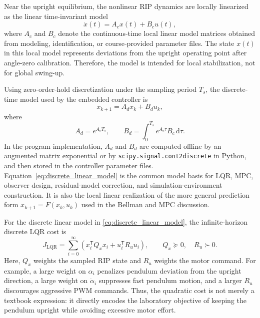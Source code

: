 \documentclass[11pt]{article}
\begin{document}
Near the upright equilibrium, the nonlinear RIP dynamics are locally linearized as the linear time-invariant model
\begin{equation}
\dot{x}(t)=A_cx(t)+B_cu(t),
\label{eq:continuous_linear_model}
\end{equation}
where $A_c$ and $B_c$ denote the continuous-time local linear model matrices obtained from modeling, identification, or course-provided parameter files. The state $x(t)$ in this local model represents deviations from the upright operating point after angle-zero calibration. Therefore, the model is intended for local stabilization, not for global swing-up.

Using zero-order-hold discretization under the sampling period $T_s$, the discrete-time model used by the embedded controller is
\begin{equation}
x_{k+1}=A_dx_k+B_du_k,
\label{eq:discrete_linear_model}
\end{equation}
where
\begin{equation}
A_d=e^{A_cT_s},
\qquad
B_d=\int_{0}^{T_s}e^{A_c\tau}B_c\,\mathrm{d}\tau.
\label{eq:zoh_discretization}
\end{equation}
In the program implementation, $A_d$ and $B_d$ are computed offline by an augmented matrix exponential or by \texttt{scipy.signal.cont2discrete} in Python, and then stored in the controller parameter files. Equation~\eqref{eq:discrete_linear_model} is the common model basis for LQR, MPC, observer design, residual-model correction, and simulation-environment construction. It is also the local linear realization of the more general prediction form $x_{k+1}=F(x_k,u_k)$ used in the Bellman and MPC discussion.

For the discrete linear model in \eqref{eq:discrete_linear_model}, the infinite-horizon discrete LQR cost is
\begin{equation}
J_{\mathrm{LQR}}
=
\sum_{i=0}^{\infty}
\left(
 x_i^{\mathsf T}Q_xx_i
 +u_i^{\mathsf T}R_uu_i
\right),
\qquad Q_x\succeq0,
\quad R_u\succ0.
\label{eq:lqr_cost}
\end{equation}
Here, $Q_x$ weights the sampled RIP state and $R_u$ weights the motor command. For example, a large weight on $\alpha_i$ penalizes pendulum deviation from the upright direction, a large weight on $\dot{\alpha}_i$ suppresses fast pendulum motion, and a larger $R_u$ discourages aggressive PWM commands. Thus, the quadratic cost is not merely a textbook expression: it directly encodes the laboratory objective of keeping the pendulum upright while avoiding excessive motor effort.
\end{document}
